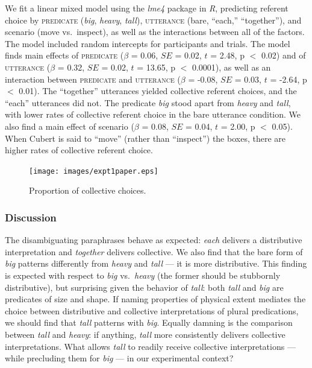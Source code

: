 \documentclass[linguex]{sp}
\begin{document}
We fit a linear mixed model \citep{baayenetal2008} using the \emph{lme4} package \citep{batesetal2014} in \emph{R}, predicting referent choice by \textsc{predicate} (\emph{big}, \emph{heavy}, \emph{tall}), \textsc{utterance} (bare, ``each,'' ``together''), and scenario (move vs.~inspect), as well as the interactions between all of the factors. The model included random intercepts for participants and trials. The model finds main effects of \textsc{predicate} ($\beta$ = 0.06, $SE$ = 0.02, $t$ = 2.48, p $<$ 0.02) and of \textsc{utterance} ($\beta$ = 0.32, $SE$ = 0.02, $t$ = 13.65, p $<$ 0.0001), as well as an interaction between \textsc{predicate} and \textsc{utterance} ($\beta$ = -0.08, $SE$ = 0.03, $t$ = -2.64, p $<$ 0.01). The ``together'' utterances yielded collective referent choices, and the ``each'' utterances did not. The predicate \emph{big} stood apart from \emph{heavy} and \emph{tall}, with lower rates of collective referent choice in the bare utterance condition. We also find a main effect of scenario ($\beta$ = 0.08, $SE$ = 0.04, $t$ = 2.00, p $<$ 0.05). When Cubert is said to ``move'' (rather than ``inspect'') the boxes, there are higher rates of collective referent choice.

\begin{figure}[h]
	\centering
	\texttt{[image: images/expt1paper.eps]}
	\vspace{-15pt}
	\caption{Proportion of collective choices.}\label{results2}
\end{figure}


\subsubsection{Discussion}

The disambiguating paraphrases behave as expected: \emph{each} delivers a distributive interpretation and \emph{together} delivers collective. We also find that the bare form of \emph{big} patterns differently from \emph{heavy} and \emph{tall} --- it is more distributive. This finding is expected with respect to \textit{big} vs.~\textit{heavy} (the former should be stubbornly distributive), but surprising given the behavior of \textit{tall}: both \emph{tall} and \emph{big} are predicates of size and shape. If naming properties of physical extent mediates the choice between distributive and collective interpretations of plural predications, we should find that \emph{tall} patterns with \emph{big}. Equally damning is the comparison between \emph{tall} and \emph{heavy}: if anything, \emph{tall} more consistently delivers collective interpretations. What allows \emph{tall} to readily receive collective interpretations --- while precluding them for \emph{big} --- in our experimental context? 
\end{document}
